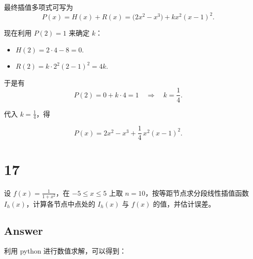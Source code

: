 \documentclass[11pt]{article}
\providecommand{\tightlist}{%
      \setlength{\itemsep}{0pt}\setlength{\parskip}{0pt}}
\begin{document}
最终插值多项式可写为 \[
P(x)= H(x) + R(x)= \bigl(2x^2-x^3\bigr)+ kx^2(x-1)^2.
\]

现在利用 \(P(2)=1\) 来确定 \(k\)：

\begin{itemize}
\tightlist
\item
  \(H(2)= 2\cdot 4-8=0\).
\item
  \(R(2)= k\cdot 2^2 (2-1)^2=4k\).
\end{itemize}

于是有 \[
P(2)= 0 + k\cdot 4 = 1\quad\Longrightarrow\quad k = \frac{1}{4}.
\]

代入 \(k=\frac{1}{4}\)，得

\[
\boxed{
P(x)= 2x^2 - x^3 + \frac{1}{4}\,x^2(x-1)^2.
}
\]

    \section{17}\label{section}

设 \(f(x) = \frac{1}{1 + x^2}\)，在 \(-5\le x \le 5\) 上取
\(n = 10\)，按等距节点求分段线性插值函数 \(I_h(x)\)，计算各节点中点处的
\(I_h(x)\) 与 \(f(x)\) 的值，并估计误差。

\subsection{Answer}\label{answer}

利用 python 进行数值求解，可以得到：
\end{document}
